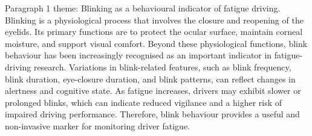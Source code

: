 Paragraph 1 theme: Blinking as a behavioural indicator of fatigue driving.
Blinking is a physiological process that involves the closure and reopening of the eyelids. Its primary functions are to protect the ocular surface, maintain corneal moisture, and support visual comfort. Beyond these physiological functions, blink behaviour has been increasingly recognised as an important indicator in fatigue-driving research. Variations in blink-related features, such as blink frequency, blink duration, eye-closure duration, and blink patterns, can reflect changes in alertness and cognitive state. As fatigue increases, drivers may exhibit slower or prolonged blinks, which can indicate reduced vigilance and a higher risk of impaired driving performance. Therefore, blink behaviour provides a useful and non-invasive marker for monitoring driver fatigue.